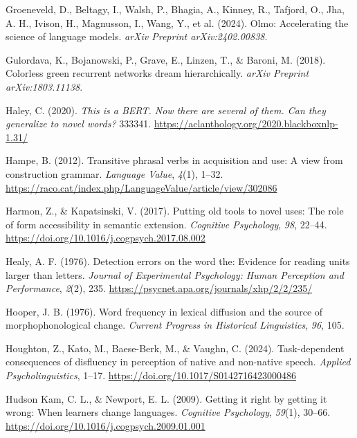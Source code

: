 \documentclass[
  12pt,
  letterpaper,
]{scrreprt}
\newlength{\cslhangindent}
\newenvironment{CSLReferences}[2] %
 {\begin{list}{}{%
  \setlength{\itemindent}{0pt}
  \setlength{\leftmargin}{0pt}
  \setlength{\parsep}{0pt}
  \ifodd #1
   \setlength{\leftmargin}{\cslhangindent}
   \setlength{\itemindent}{-1\cslhangindent}
  \fi
  \setlength{\itemsep}{#2\baselineskip}}}
 {\end{list}}
\begin{document}
\begin{CSLReferences}{1}{0}
Groeneveld, D., Beltagy, I., Walsh, P., Bhagia, A., Kinney, R., Tafjord,
O., Jha, A. H., Ivison, H., Magnusson, I., Wang, Y., et al. (2024).
Olmo: Accelerating the science of language models. \emph{arXiv Preprint
arXiv:2402.00838}.

Gulordava, K., Bojanowski, P., Grave, E., Linzen, T., \& Baroni, M.
(2018). Colorless green recurrent networks dream hierarchically.
\emph{arXiv Preprint arXiv:1803.11138}.

Haley, C. (2020). \emph{This is a BERT. Now there are several of them.
Can they generalize to novel words?} 333341.
\url{https://aclanthology.org/2020.blackboxnlp-1.31/}

Hampe, B. (2012). Transitive phrasal verbs in acquisition and use: A
view from construction grammar. \emph{Language Value}, \emph{4}(1),
1--32.
\url{https://raco.cat/index.php/LanguageValue/article/view/302086}

Harmon, Z., \& Kapatsinski, V. (2017). Putting old tools to novel uses:
The role of form accessibility in semantic extension. \emph{Cognitive
Psychology}, \emph{98}, 22--44.
\url{https://doi.org/10.1016/j.cogpsych.2017.08.002}

Healy, A. F. (1976). Detection errors on the word the: Evidence for
reading units larger than letters. \emph{Journal of Experimental
Psychology: Human Perception and Performance}, \emph{2}(2), 235.
\url{https://psycnet.apa.org/journals/xhp/2/2/235/}

Hooper, J. B. (1976). Word frequency in lexical diffusion and the source
of morphophonological change. \emph{Current Progress in Historical
Linguistics}, \emph{96}, 105.

Houghton, Z., Kato, M., Baese-Berk, M., \& Vaughn, C. (2024).
Task-dependent consequences of disfluency in perception of native and
non-native speech. \emph{Applied Psycholinguistics}, 1--17.
\url{https://doi.org/10.1017/S0142716423000486}

Hudson Kam, C. L., \& Newport, E. L. (2009). Getting it right by getting
it wrong: When learners change languages. \emph{Cognitive Psychology},
\emph{59}(1), 30--66.
\url{https://doi.org/10.1016/j.cogpsych.2009.01.001}


\end{CSLReferences}
\end{document}
